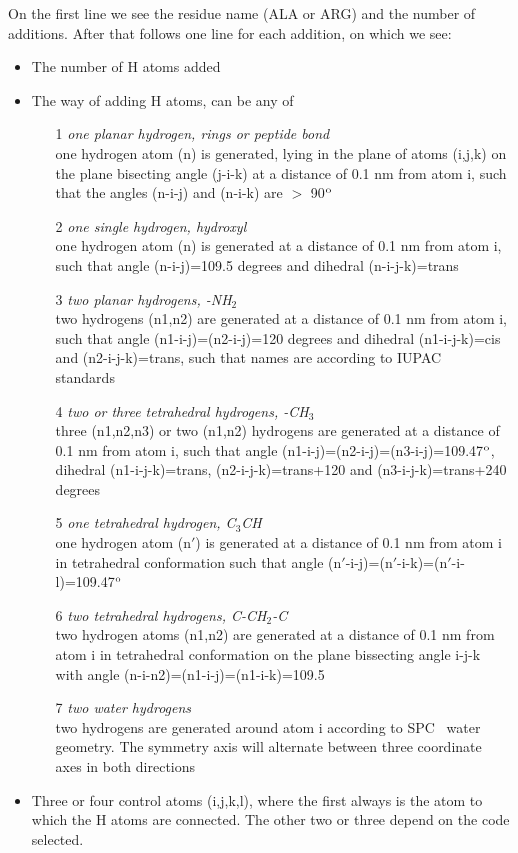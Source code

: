 On the first line we see the residue name (ALA or ARG) and the number
of additions. After that follows one line for each addition, on which
we see:
\begin{itemize}
\item The number of H atoms added
\item The way of adding H atoms, can be any of
\begin{enumerate}
\item[1]{\em one planar hydrogen, {\eg} rings or peptide bond}\\
one hydrogen atom (n) is generated, lying in the plane of atoms
(i,j,k) on the plane bisecting angle (j-i-k) at a distance of 0.1 nm
from atom i, such that the angles (n-i-j) and (n-i-k) are $>$ 90$^{\rm o}$

\item[2]{\em one single hydrogen, {\eg} hydroxyl}\\
one hydrogen atom (n) is generated at a distance of 0.1 nm from atom
i, such that angle (n-i-j)=109.5 degrees and dihedral (n-i-j-k)=trans

\item[3]{\em two planar hydrogens, {\eg} -NH{$_2$}}\\
two hydrogens (n1,n2) are generated at a distance of 0.1 nm from atom
i, such that angle (n1-i-j)=(n2-i-j)=120 degrees and dihedral
(n1-i-j-k)=cis and (n2-i-j-k)=trans, such that names are according to
IUPAC standards~\cite{iupac70}

\item[4]{\em two or three tetrahedral hydrogens, {\eg} -CH{$_3$}}\\
three (n1,n2,n3) or two (n1,n2) hydrogens are generated at a distance
of 0.1 nm from atom i, such that angle
(n1-i-j)=(n2-i-j)=(n3-i-j)=109.47$^{\rm o}$, dihedral (n1-i-j-k)=trans,
(n2-i-j-k)=trans+120 and (n3-i-j-k)=trans+240 degrees

\item[5]{\em one tetrahedral hydrogen, {\eg} C{$_3$}CH}\\
one hydrogen atom (n$\prime$) is generated at a distance of 0.1 nm from atom
i in tetrahedral conformation such that angle
(n$\prime$-i-j)=(n$\prime$-i-k)=(n$\prime$-i-l)=109.47$^{\rm o}$

\item[6]{\em two tetrahedral hydrogens, {\eg} C-CH{$_2$}-C}\\
two hydrogen atoms (n1,n2) are generated at a distance of 0.1 nm from
atom i in tetrahedral conformation on the plane bissecting angle i-j-k
with angle (n-i-n2)=(n1-i-j)=(n1-i-k)=109.5

\item[7]{\em two water hydrogens}\\
two hydrogens are generated around atom i according to
SPC~\cite{Berendsen81} water geometry. The symmetry axis will
alternate between three coordinate axes in both directions
\end{enumerate}

\item
Three or four control atoms (i,j,k,l), where the first always is the
atom to which the H atoms are connected. The other two or three depend
on the code selected.
\end{itemize}

